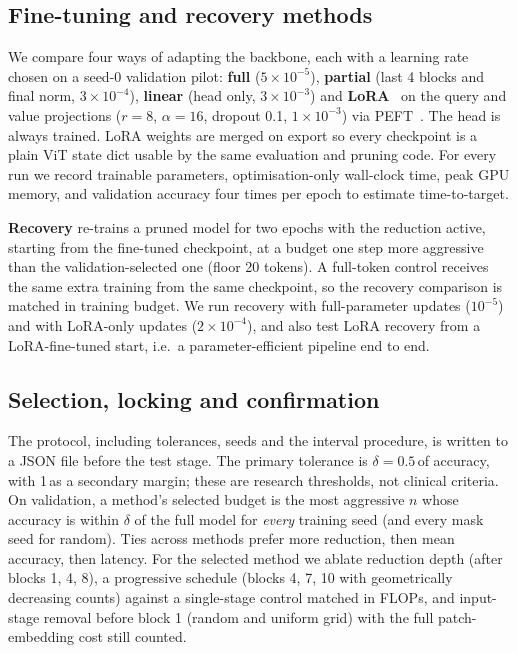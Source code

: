 \subsection{Fine-tuning and recovery methods}
\label{sec:finetune}
We compare four ways of adapting the backbone, each with a learning rate chosen on a seed-0 validation pilot: \textbf{full} ($5\times10^{-5}$), \textbf{partial} (last 4 blocks and final norm, $3\times10^{-4}$), \textbf{linear} (head only, $3\times10^{-3}$) and \textbf{LoRA}~\cite{hu2022lora} on the query and value projections ($r{=}8$, $\alpha{=}16$, dropout 0.1, $1\times10^{-3}$) via PEFT~\cite{peft}. The head is always trained. LoRA weights are merged on export so every checkpoint is a plain ViT state dict usable by the same evaluation and pruning code. For every run we record trainable parameters, optimisation-only wall-clock time, peak GPU memory, and validation accuracy four times per epoch to estimate time-to-target.

\textbf{Recovery} re-trains a pruned model for two epochs with the reduction active, starting from the fine-tuned checkpoint, at a budget one step more aggressive than the validation-selected one (floor 20 tokens). A full-token control receives the same extra training from the same checkpoint, so the recovery comparison is matched in training budget. We run recovery with full-parameter updates ($10^{-5}$) and with LoRA-only updates ($2\times10^{-4}$), and also test LoRA recovery from a LoRA-fine-tuned start, i.e.\ a parameter-efficient pipeline end to end.

\subsection{Selection, locking and confirmation}
\label{sec:protocol}
The protocol, including tolerances, seeds and the interval procedure, is written to a JSON file before the test stage. The primary tolerance is $\delta{=}0.5$\,\pp of accuracy, with 1\,\pp as a secondary margin; these are research thresholds, not clinical criteria. On validation, a method's selected budget is the most aggressive $n$ whose accuracy is within $\delta$ of the full model for \emph{every} training seed (and every mask seed for random). Ties across methods prefer more reduction, then mean accuracy, then latency. For the selected method we ablate reduction depth (after blocks 1, 4, 8), a progressive schedule (blocks 4, 7, 10 with geometrically decreasing counts) against a single-stage control matched in FLOPs, and input-stage removal before block 1 (random and uniform grid) with the full patch-embedding cost still counted.

